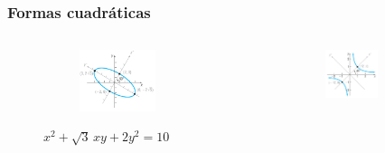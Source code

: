{\nologo 
\begin{frame}\frametitle{Formas cuadráticas}

\begin{columns}[c]
    	\hspace{8mm}
		\begin{column}{0.45\textwidth}
			\begin{figure}
				\centering
				\begin{subfigure}[b]{\textwidth}
					\includegraphics[width=0.93\textwidth]{imagenes/elipse3}
				\end{subfigure}			
				\vspace{0mm}
				\caption{$x^2+\sqrt{3}\,xy+2y^2=10$}
			\end{figure}
		\end{column}
		\hspace{8mm}
		\begin{column}{0.45\textwidth}
			\begin{figure}
				\centering
				\begin{subfigure}[b]{\textwidth}
					\includegraphics[width=0.8\textwidth]{imagenes/hiperbola3}					

\end{subfigure}
\end{figure}
\end{column}
\end{columns}
\end{frame}}
